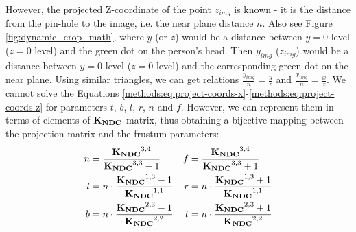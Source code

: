 However, the projected Z-coordinate of the point $z_{img}$ is known - it is the distance from the pin-hole to the image, i.e. the near plane distance $n$. Also see Figure \ref{fig:dynamic_crop_math}, where $y$ (or $z$) would be a distance between $y=0$ level ($z=0$ level) and the green dot on the person's head. Then $y_{img}$ ($z_{img}$) would be a distance between $y=0$ level ($z = 0$ level) and the corresponding green dot on the near plane. Using similar triangles, we can get relations $\tfrac{y_{img}}{n} = \tfrac{y}{z}$ and $\tfrac{x_{img}}{n} = \tfrac{x}{z}$. We cannot solve the Equations \ref{methods:eq:project-coords-x}-\ref{methods:eq:project-coords-z} for parameters $t$, $b$, $l$, $r$, $n$ and $f$. However, we can represent them in terms of elements of $\bm{\mathrm{K_{NDC}}}$ matrix, thus obtaining a bijective mapping between the projection matrix and the frustum parameters:
\begin{align}
	n &= \dfrac{\bm{\mathrm{K_{NDC}}}^{3,4}}{\bm{\mathrm{K_{NDC}}}^{3,3} - 1} & f &= \dfrac{\bm{\mathrm{K_{NDC}}}^{3, 4}}{\bm{\mathrm{K_{NDC}}}^{3, 3} + 1} \\
	l &= n\cdot \dfrac{\bm{\mathrm{K_{NDC}}}^{1,3} - 1}{\bm{\mathrm{K_{NDC}}}^{1,1}} & r &= n\cdot \dfrac{\bm{\mathrm{K_{NDC}}}^{1,3} + 1}{\bm{\mathrm{K_{NDC}}}^{1,1}} \\
	b &= n\cdot \dfrac{\bm{\mathrm{K_{NDC}}}^{2,3} - 1}{\bm{\mathrm{K_{NDC}}}^{2,2}} & t &= n\cdot \dfrac{\bm{\mathrm{K_{NDC}}}^{2,3} + 1}{\bm{\mathrm{K_{NDC}}}^{2,2}} \label{methods:eq:frustum-from-matrix}
\end{align}

